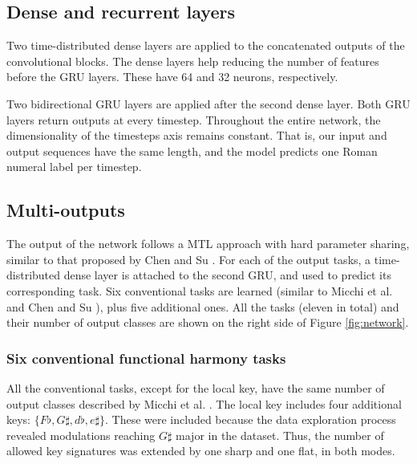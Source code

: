 \documentclass{article}
\begin{document}
\subsection{Dense and recurrent layers}

Two time-distributed dense layers are applied to the concatenated outputs of the convolutional blocks. The dense layers help reducing the number of features before the GRU layers. These have 64 and 32 neurons, respectively. 

Two bidirectional GRU \cite{cho2014learning} layers are applied after the second dense layer. 
Both GRU layers return outputs at every timestep. 
Throughout the entire network, the dimensionality of the timesteps axis remains constant. That is, our input and output sequences have the same length, and the model predicts one Roman numeral label per timestep. 

\subsection{Multi-outputs}

The output of the network follows a MTL approach with hard parameter sharing, similar to that proposed by Chen and Su \cite{chen2018functional}. For each of the output tasks, a time-distributed dense layer is attached to the second GRU, and used to predict its corresponding task. 
Six conventional tasks are learned (similar to Micchi et al. and Chen and Su \cite{micchi2020not, chen2021attend}), plus five additional ones. All the tasks (eleven in total) and their number of output classes are shown on the right side of Figure \ref{fig:network}.

\subsubsection{Six conventional functional harmony tasks}
All the conventional tasks, except for the local key, have the same number of output classes described by Micchi et al. \cite{micchi2020not}. The local key includes four additional keys: $\{F\flat, G\sharp, d\flat, e\sharp\}$. These were included because the data exploration process revealed modulations reaching $G\sharp$ major in the dataset.
Thus, the number of allowed key signatures was extended by one sharp and one flat, in both modes.
\end{document}
